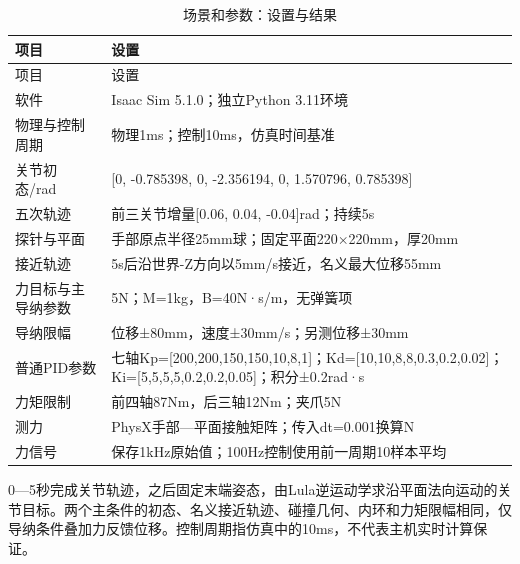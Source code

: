 \FloatBarrier\begingroup\small\setlength{\tabcolsep}{2.5pt}
\begin{longtable}[]{@{}
  >{\raggedright\arraybackslash}p{}
  >{\raggedright\arraybackslash}p{}@{}}
\caption{场景和参数：设置与结果}\label{tab:s11-1}\tabularnewline
\toprule\noalign{}
\begin{minipage}[b]{\linewidth}\raggedright
项目
\end{minipage} & \begin{minipage}[b]{\linewidth}\raggedright
设置
\end{minipage} \\
\midrule\noalign{}
\endfirsthead
\toprule\noalign{}
\begin{minipage}[b]{\linewidth}\raggedright
项目
\end{minipage} & \begin{minipage}[b]{\linewidth}\raggedright
设置
\end{minipage} \\
\midrule\noalign{}
\endhead
\bottomrule\noalign{}
\endlastfoot
软件 & Isaac Sim 5.1.0；独立Python 3.11环境 \\
物理与控制周期 & 物理1ms；控制10ms，仿真时间基准 \\
关节初态/rad & {[}0, -0.785398, 0, -2.356194, 0, 1.570796, 0.785398{]} \\
五次轨迹 & 前三关节增量{[}0.06, 0.04, -0.04{]}rad；持续5s \\
探针与平面 & 手部原点半径25mm球；固定平面220\(\times\)220mm，厚20mm \\
接近轨迹 & 5s后沿世界-Z方向以5mm/s接近，名义最大位移55mm \\
力目标与主导纳参数 & 5N；M=1kg，B=40N·s/m，无弹簧项 \\
导纳限幅 & 位移±80mm，速度±30mm/s；另测位移±30mm \\
普通PID参数 & 七轴Kp={[}200,200,150,150,10,8,1{]}；Kd={[}10,10,8,8,0.3,0.2,0.02{]}；Ki={[}5,5,5,5,0.2,0.2,0.05{]}；积分±0.2rad·s \\
力矩限制 & 前四轴87Nm，后三轴12Nm；夹爪5N \\
测力 & PhysX手部---平面接触矩阵；传入dt=0.001换算N \\
力信号 & 保存1kHz原始值；100Hz控制使用前一周期10样本平均 \\
\end{longtable}\endgroup

0---5秒完成关节轨迹，之后固定末端姿态，由Lula逆运动学求沿平面法向运动的关节目标。两个主条件的初态、名义接近轨迹、碰撞几何、内环和力矩限幅相同，仅导纳条件叠加力反馈位移。控制周期指仿真中的10ms，不代表主机实时计算保证。

